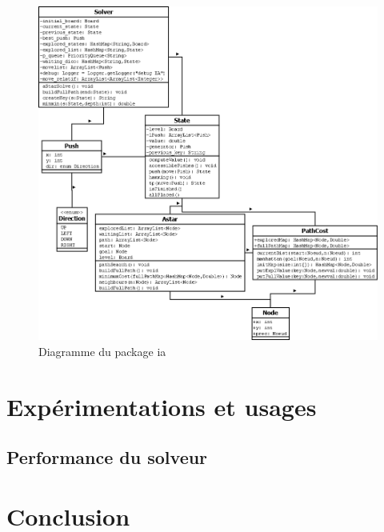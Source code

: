 \documentclass[a4paper,12pt]{article} %
\begin{document}
\begin{figure}[!h]
\centering
\includegraphics[scale=0.3]{images/diag_ia.png}
\caption{Diagramme du package ia}
\end{figure}

\section{Expérimentations et usages}

\subsection{Performance du solveur}

\section*{Conclusion}
\end{document}
